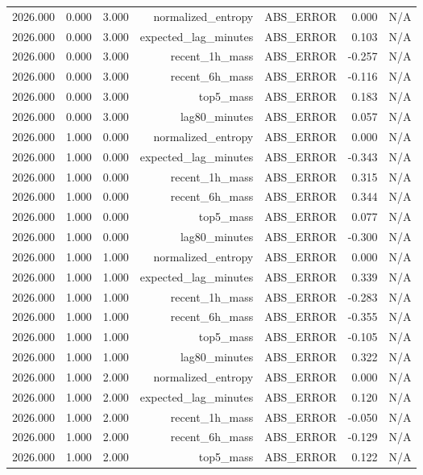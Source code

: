 \begin{table}[h!]
\begin{tabular}{lrrrrrr}
2026.000 & 0.000 & 3.000 & normalized\_entropy & ABS\_ERROR & 0.000 & N/A \\
2026.000 & 0.000 & 3.000 & expected\_lag\_minutes & ABS\_ERROR & 0.103 & N/A \\
2026.000 & 0.000 & 3.000 & recent\_1h\_mass & ABS\_ERROR & -0.257 & N/A \\
2026.000 & 0.000 & 3.000 & recent\_6h\_mass & ABS\_ERROR & -0.116 & N/A \\
2026.000 & 0.000 & 3.000 & top5\_mass & ABS\_ERROR & 0.183 & N/A \\
2026.000 & 0.000 & 3.000 & lag80\_minutes & ABS\_ERROR & 0.057 & N/A \\
2026.000 & 1.000 & 0.000 & normalized\_entropy & ABS\_ERROR & 0.000 & N/A \\
2026.000 & 1.000 & 0.000 & expected\_lag\_minutes & ABS\_ERROR & -0.343 & N/A \\
2026.000 & 1.000 & 0.000 & recent\_1h\_mass & ABS\_ERROR & 0.315 & N/A \\
2026.000 & 1.000 & 0.000 & recent\_6h\_mass & ABS\_ERROR & 0.344 & N/A \\
2026.000 & 1.000 & 0.000 & top5\_mass & ABS\_ERROR & 0.077 & N/A \\
2026.000 & 1.000 & 0.000 & lag80\_minutes & ABS\_ERROR & -0.300 & N/A \\
2026.000 & 1.000 & 1.000 & normalized\_entropy & ABS\_ERROR & 0.000 & N/A \\
2026.000 & 1.000 & 1.000 & expected\_lag\_minutes & ABS\_ERROR & 0.339 & N/A \\
2026.000 & 1.000 & 1.000 & recent\_1h\_mass & ABS\_ERROR & -0.283 & N/A \\
2026.000 & 1.000 & 1.000 & recent\_6h\_mass & ABS\_ERROR & -0.355 & N/A \\
2026.000 & 1.000 & 1.000 & top5\_mass & ABS\_ERROR & -0.105 & N/A \\
2026.000 & 1.000 & 1.000 & lag80\_minutes & ABS\_ERROR & 0.322 & N/A \\
2026.000 & 1.000 & 2.000 & normalized\_entropy & ABS\_ERROR & 0.000 & N/A \\
2026.000 & 1.000 & 2.000 & expected\_lag\_minutes & ABS\_ERROR & 0.120 & N/A \\
2026.000 & 1.000 & 2.000 & recent\_1h\_mass & ABS\_ERROR & -0.050 & N/A \\
2026.000 & 1.000 & 2.000 & recent\_6h\_mass & ABS\_ERROR & -0.129 & N/A \\
2026.000 & 1.000 & 2.000 & top5\_mass & ABS\_ERROR & 0.122 & N/A \\

\end{tabular}
\end{table}
